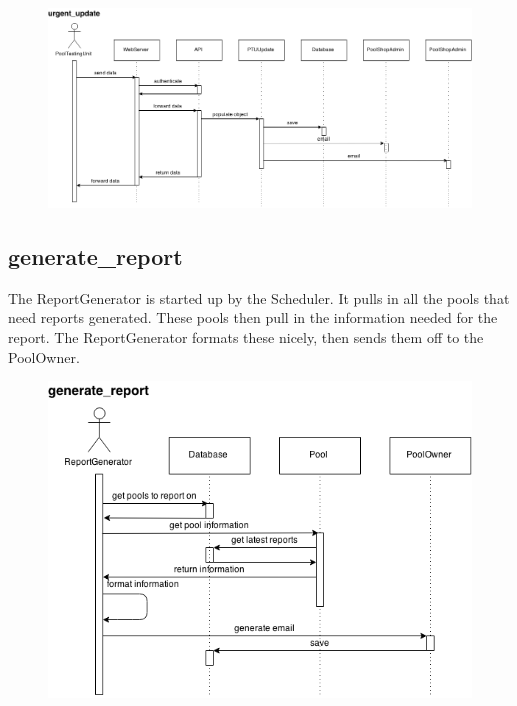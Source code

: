 \begin{figure}[!ht]
\begin{center}
	\includegraphics[width=14cm]{images/urgent_update}
\end{center}
\end{figure}
\FloatBarrier

\subsection{generate\_report}
\par
The ReportGenerator is started up by the Scheduler. It pulls in all the pools that need reports generated. These pools then pull in the information needed for the report. The ReportGenerator formats these nicely, then sends them off to the PoolOwner.

\begin{figure}[!ht]
\begin{center}
	\includegraphics[width=14cm]{images/generate_report}
\end{center}
\end{figure}
\FloatBarrier

